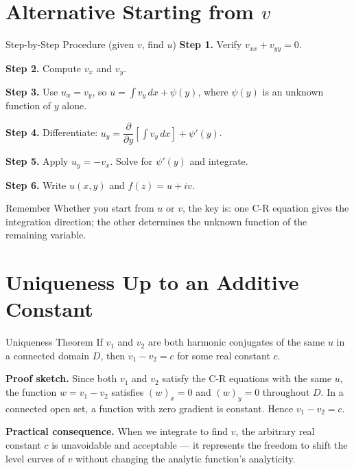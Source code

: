\documentclass[12pt,a4paper]{article}
\begin{document}
\section{Alternative Starting from $v$}

\begin{infobox}{Step-by-Step Procedure (given $v$, find $u$)}
\textbf{Step 1.} Verify $v_{xx}+v_{yy}=0$.

\textbf{Step 2.} Compute $v_x$ and $v_y$.

\textbf{Step 3.} Use $u_x = v_y$, so $u = \displaystyle\int v_y\,dx + \psi(y)$,
where $\psi(y)$ is an unknown function of $y$ alone.

\textbf{Step 4.} Differentiate: $u_y = \dfrac{\partial}{\partial y}\!\left[\int v_y\,dx\right] + \psi'(y)$.

\textbf{Step 5.} Apply $u_y = -v_x$. Solve for $\psi'(y)$ and integrate.

\textbf{Step 6.} Write $u(x,y)$ and $f(z)=u+iv$.
\end{infobox}

\begin{learnbox}{Remember}
Whether you start from $u$ or $v$, the key is: one C-R equation gives the integration
direction; the other determines the unknown function of the remaining variable.
\end{learnbox}

\section{Uniqueness Up to an Additive Constant}

\begin{infobox}{Uniqueness Theorem}
If $v_1$ and $v_2$ are both harmonic conjugates of the same $u$ in a connected domain $D$,
then $v_1 - v_2 = c$ for some real constant $c$.
\end{infobox}

\textbf{Proof sketch.} Since both $v_1$ and $v_2$ satisfy the C-R equations with the same
$u$, the function $w = v_1 - v_2$ satisfies $(w)_x = 0$ and $(w)_y = 0$ throughout $D$.
In a connected open set, a function with zero gradient is constant. Hence $v_1-v_2=c$.

\medskip
\textbf{Practical consequence.} When we integrate to find $v$, the arbitrary real constant
$c$ is unavoidable and acceptable --- it represents the freedom to shift the level curves
of $v$ without changing the analytic function's analyticity.
\end{document}
